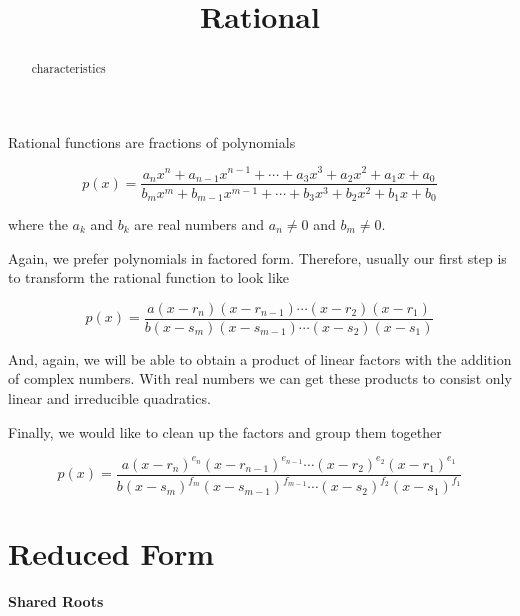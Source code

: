 \documentclass{ximera}
\title{Rational}
\begin{document}
\begin{abstract}
characteristics
\end{abstract}
\maketitle










Rational functions are fractions of polynomials




\[ p(x) =   \frac{ a_n x^n + a_{n-1} x^{n-1} + \cdots + a_3 x^3 + a_2 x^2 + a_1 x + a_0  } { b_m x^m + b_{m-1} x^{m-1} + \cdots + b_3 x^3 + b_2 x^2 + b_1 x + b_0 }   \]



where the $a_k$ and $b_k$ are real numbers and $a_n \ne 0$ and $b_m \ne 0$.








Again, we prefer polynomials in factored form.  Therefore, usually our first step is to transform the rational function to look like



\[ p(x) =   \frac{ a (x-r_n)(x-r_{n-1})  \cdots (x-r_2)(x-r_1)  } { b (x-s_m)(x-s_{m-1})  \cdots (x-s_2)(x-s_1) }   \]




And, again, we will be able to obtain a product of linear factors with the addition of complex numbers.  With real numbers we can get these products to consist only linear and irreducible quadratics.




Finally, we would like to clean up the factors and group them together






\[ p(x) =   \frac{ a (x-r_n)^{e_n} (x-r_{n-1})^{e_{n-1}}  \cdots (x-r_2)^{e_2} (x-r_1)^{e_1}  } { b (x-s_m)^{f_m} (x-s_{m-1})^{f_{m-1}}  \cdots (x-s_2)^{f_2} (x-s_1)^{f_1} }   \]






\section{Reduced Form}

\textbf{Shared Roots}
\end{document}
